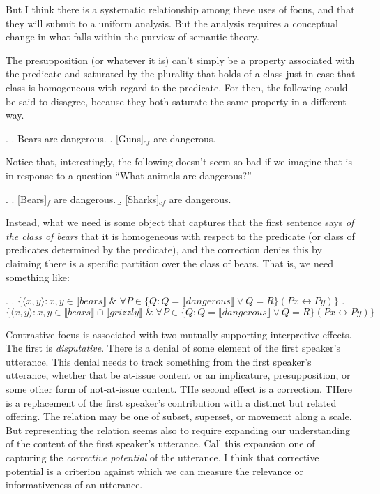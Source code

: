 \documentclass[letterpaper,10pt]{article}
\begin{document}
But I think there is a systematic relationship among these uses of focus, and that they will submit to a uniform analysis.  But the analysis requires a conceptual change in what falls within the purview of semantic theory.  

The presupposition (or whatever it is) can't simply be a property associated with the predicate and saturated by the plurality that holds of a class just in case that class is homogeneous with regard to the predicate.  For then, the following could be said to disagree, because they both saturate the same property in a different way.

\ex. \a. Bears are dangerous.
\b. [Guns]$_{cf}$ are dangerous.

Notice that, interestingly, the following doesn't seem so bad if we imagine that \Next[a] is in response to a question ``What animals are dangerous?''

\ex. \a. [Bears]$_f$ are dangerous.
\b. [Sharks]$_{cf}$ are dangerous.

Instead, what we need is some object that captures that the first sentence says \textit{of the class of bears} that it is homogeneous with respect to the predicate (or class of predicates determined by the predicate), and the correction denies this by claiming there is a specific partition over the class of bears.  That is, we need something like:

\ex. \a. $\{\langle x,y\rangle: x,y\in \llbracket bears\rrbracket \;\&\; \forall P\in \{Q: Q = \llbracket dangerous\rrbracket \vee Q=R\}(Px \leftrightarrow Py)\}$
\b. $\{\langle x,y\rangle: x,y\in \llbracket bears\rrbracket\cap \llbracket grizzly\rrbracket \;\&\; \forall P\in \{Q: Q = \llbracket dangerous\rrbracket \vee Q=R\}(Px \leftrightarrow Py)\}$

Contrastive focus is associated with two mutually supporting interpretive effects.  The first is \textit{disputative}.  There is a denial of some element of the first speaker's utterance. This denial needs to track something from the first speaker's utterance, whether that be at-issue content or an implicature, presupposition, or some other form of not-at-issue content.  THe second effect is a correction.  THere is a replacement of the first speaker's contribution with a distinct but related offering.  The relation may be one of subset, superset, or movement along a scale.  But representing the relation seems also to require expanding our understanding of the content of the first speaker's utterance.  Call this expansion one of capturing the \textit{corrective potential} of the utterance.  I think that corrective potential is a criterion against which we can measure the relevance or informativeness of an utterance.
\end{document}
